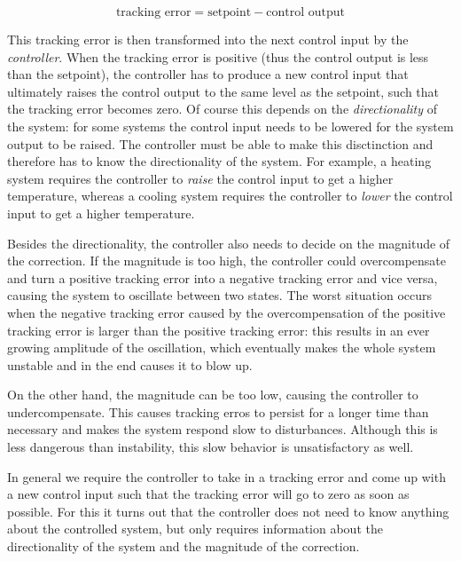 \begin{equation} \label{eq:tracking-error}
\text{tracking error} = \text{setpoint} - \text{control output}
\end{equation}

This tracking error is then transformed into the next control input by the \textit{controller}. When the tracking error is positive (thus the control output is less than the setpoint), the controller has to produce a new control input that ultimately raises the control output to the same level as the setpoint, such that the tracking error becomes zero. Of course this depends on the \textit{directionality} of the system: for some systems the control input needs to be lowered for the system output to be raised. The controller must be able to make this disctinction and therefore has to know the directionality of the system. For example, a heating system requires the controller to \emph{raise} the control input to get a higher temperature, whereas a cooling system requires the controller to \emph{lower} the control input to get a higher temperature.

Besides the directionality, the controller also needs to decide on the magnitude of the correction. If the magnitude is too high, the controller could overcompensate and turn a positive tracking error into a negative tracking error and vice versa, causing the system to oscillate between two states. The worst situation occurs when the negative tracking error caused by the overcompensation of the positive tracking error is larger than the positive tracking error: this results in an ever growing amplitude of the oscillation, which eventually makes the whole system unstable and in the end causes it to blow up.

On the other hand, the magnitude can be too low, causing the controller to undercompensate. This causes tracking erros to persist for a longer time than necessary and makes the system respond slow to disturbances. Although this is less dangerous than instability, this slow behavior is unsatisfactory as well.

In general we require the controller to take in a tracking error and come up with a new control input such that the tracking error will go to zero as soon as possible. For this it turns out that the controller does not need to know anything about the controlled system, but only requires information about the directionality of the system and the magnitude of the correction.

